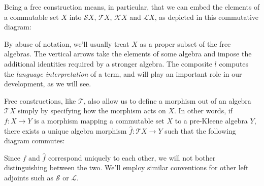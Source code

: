\documentclass[a4paper,UKenglish,cleveref, autoref, thm-restate]{lipics-v2021}
\begin{document}
%

Being a free construction means, in particular, that we can embed the elements
of a commutable set $X$ into $\mathcal{S}X$, $\mathcal{T}X$, $\mathcal{K}X$ and
$\mathcal{L}X$, as depicted in this commutative diagram:
\begin{center}
\end{center}
By abuse of notation, we'll usually treat $X$ as a proper subset of the free  
algebras. The vertical arrows take the elements of some algebra and impose the
additional identities required by a stronger algebra.  The composite $l$
computes the \emph{language interpretation} of a term, and will play an
important role in our development, as we will see.

Free constructions, like \(\mathcal{T}\), also allow us to define a morphism out
of an algebra $\mathcal{T}X$ simply by specifying how the morphism acts on $X$.
In other words, if $f : X  \to  Y$ is a morphism mapping a commutable set $X$ to a
pre-Kleene algebra $Y$, there exists a unique algebra morphism
$\hat{f} : \mathcal{T}X  \to  Y$ such that the following diagram commutes:
\begin{center}
\end{center}
Since $f$ and $\hat{f}$ correspond uniquely to each other, we will not bother
distinguishing between the two.  We'll employ similar conventions for other left
adjoints such as $\mathcal{S}$ or $\mathcal{L}$.
\end{document}
